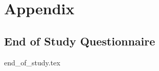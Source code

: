 
\cleardoublepage

\section{Appendix}

\subsection{End of Study Questionnaire} \label{app:end_of_study}
{end_of_study.tex}


\newpage